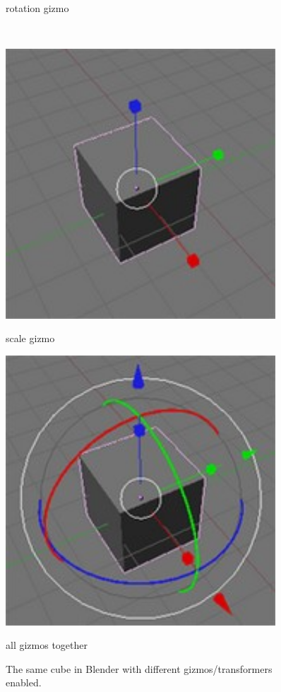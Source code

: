 \begin{figure}[htbp]
\begin{minipage}{.5\textwidth}
  	\caption{rotation gizmo \cite{blenderwiki}}
  \end{minipage}\\
  \begin{minipage}{.5\textwidth}
    \centering
    \includegraphics[width=0.9\textwidth]{../assets/Manual-Manipulators-Scale.jpg}
  	\caption{scale gizmo \cite{blenderwiki}}
  \end{minipage}
  \begin{minipage}{.5\textwidth}
    \centering
    \includegraphics[width=0.9\textwidth]{../assets/Manual-Manipulators-Combo.jpg}
  	\caption{all gizmos together \cite{blenderwiki}}
    \label{blender4}
  \end{minipage}
  \caption{The same cube in Blender with different gizmos/transformers enabled.}
\end{figure}
